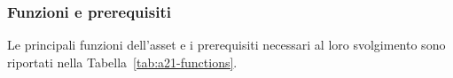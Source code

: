\subsubsection{Funzioni e prerequisiti}
Le principali funzioni dell'asset e i prerequisiti necessari al loro svolgimento sono riportati nella Tabella~\ref{tab:a21-functions}.












